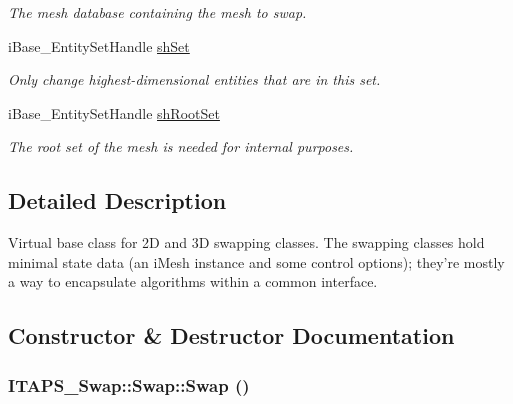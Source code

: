 \begin{DoxyCompactItemize}
\begin{DoxyCompactList}\small\item\em The mesh database containing the mesh to swap. \item\end{DoxyCompactList}\item 
iBase\_\-EntitySetHandle \hyperlink{class_i_t_a_p_s___swap_1_1_swap_ae9ab60da4630d1439edcd5401a4be85d}{shSet}
\begin{DoxyCompactList}\small\item\em Only change highest-\/dimensional entities that are in this set. \item\end{DoxyCompactList}\item 
\hypertarget{class_i_t_a_p_s___swap_1_1_swap_a888f09cfa94a1c9ec0c1851ec45ee1a8}{
iBase\_\-EntitySetHandle \hyperlink{class_i_t_a_p_s___swap_1_1_swap_a888f09cfa94a1c9ec0c1851ec45ee1a8}{shRootSet}}
\label{class_i_t_a_p_s___swap_1_1_swap_a888f09cfa94a1c9ec0c1851ec45ee1a8}

\begin{DoxyCompactList}\small\item\em The root set of the mesh is needed for internal purposes. \item\end{DoxyCompactList}\end{DoxyCompactItemize}


\subsection{Detailed Description}
Virtual base class for 2D and 3D swapping classes. The swapping classes hold minimal state data (an iMesh instance and some control options); they're mostly a way to encapsulate algorithms within a common interface. 

\subsection{Constructor \& Destructor Documentation}
\hypertarget{class_i_t_a_p_s___swap_1_1_swap_a169ddddc93fdbddcca76a78e6df090d2}{
\subsubsection[{Swap}]{\setlength{\rightskip}{0pt plus 5cm}ITAPS\_\-Swap::Swap::Swap ()}}
\label{class_i_t_a_p_s___swap_1_1_swap_a169ddddc93fdbddcca76a78e6df090d2}


